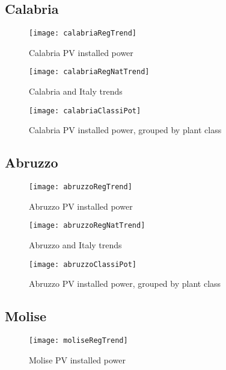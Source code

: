 \documentclass[12pt,a4paper,openright,twoside]{report}
\begin{document}
\subsection*{Calabria}

\begin{figure}[hp]
	\centering
	\texttt{[image: calabriaRegTrend]}
	\caption{Calabria PV installed power}
	\label{calabriaRegTrend}
\end{figure}

\begin{figure}[hp]
	\centering
	\texttt{[image: calabriaRegNatTrend]}
	\caption{Calabria and Italy trends}
	\label{calabriaRegNatTrend}
\end{figure}

\begin{figure}[hp]
	\centering
	\texttt{[image: calabriaClassiPot]}
	\caption{Calabria PV installed power, grouped by plant class}
	\label{calabriaClassiPot}
\end{figure}

\subsection*{Abruzzo}

\begin{figure}[hp]
	\centering
	\texttt{[image: abruzzoRegTrend]}
	\caption{Abruzzo PV installed power}
	\label{abruzzoRegTrend}
\end{figure}

\begin{figure}[hp]
	\centering
	\texttt{[image: abruzzoRegNatTrend]}
	\caption{Abruzzo and Italy trends}
	\label{abruzzoRegNatTrend}
\end{figure}

\begin{figure}[hp]
	\centering
	\texttt{[image: abruzzoClassiPot]}
	\caption{Abruzzo PV installed power, grouped by plant class}
	\label{abruzzoClassiPot}
\end{figure}

\subsection*{Molise}

\begin{figure}[hp]
	\centering
	\texttt{[image: moliseRegTrend]}
	\caption{Molise PV installed power}
	\label{moliseRegTrend}
\end{figure}
\end{document}
